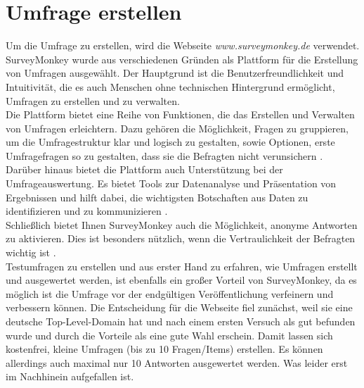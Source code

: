 \section{Umfrage erstellen}
Um die Umfrage zu erstellen, wird die Webseite \emph{www.surveymonkey.de} verwendet. 
SurveyMonkey wurde aus verschiedenen Gründen als Plattform für die Erstellung von Umfragen ausgewählt. Der Hauptgrund ist die Benutzerfreundlichkeit und Intuitivität, die es auch Menschen ohne technischen Hintergrund ermöglicht, Umfragen zu erstellen und zu verwalten\cite{surveymonkey-create-surveys}.\\
Die Plattform bietet eine Reihe von Funktionen, die das Erstellen und Verwalten von Umfragen erleichtern. Dazu gehören die Möglichkeit, Fragen zu gruppieren, um die Umfragestruktur klar und logisch zu gestalten, sowie Optionen, erste Umfragefragen so zu gestalten, dass sie die Befragten nicht verunsichern \cite{surveymonkey-create-surveys}.\\
Darüber hinaus bietet die Plattform auch Unterstützung bei der Umfrageauswertung. Es bietet Tools zur Datenanalyse und  Präsentation von Ergebnissen und hilft dabei, die wichtigsten Botschaften aus  Daten zu identifizieren und zu kommunizieren \cite{surveymonkey-auswertung-einer-umfrage}. \\
Schließlich bietet Ihnen SurveyMonkey auch die Möglichkeit, anonyme Antworten zu aktivieren. Dies ist besonders nützlich, wenn die Vertraulichkeit der Befragten wichtig ist \cite{surveymonkey-anonymous-responses}.\\
Testumfragen zu erstellen und aus erster Hand zu erfahren, wie Umfragen erstellt und ausgewertet werden, ist ebenfalls ein großer Vorteil von SurveyMonkey, da es möglich ist die Umfrage vor der endgültigen Veröffentlichung verfeinern und verbessern können. 
Die Entscheidung für die Webseite fiel zunächst, weil sie eine deutsche Top-Level-Domain hat und nach einem ersten Versuch als gut befunden wurde und durch die Vorteile als eine gute Wahl erschein.
Damit lassen sich kostenfrei, kleine Umfragen (bis zu 10 Fragen/Items) erstellen. Es können allerdings auch maximal nur 10 Antworten ausgewertet werden. Was leider erst im Nachhinein aufgefallen ist.

